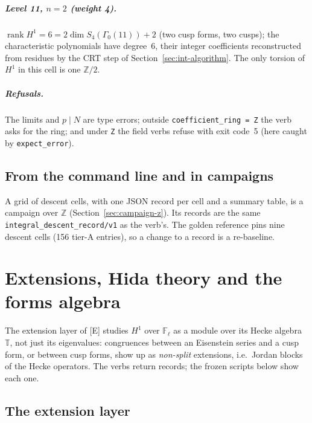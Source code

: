 \documentclass[11pt,openany]{report}
\newcommand{\Z}{\mathbb{Z}}
\newcommand{\Fl}{\mathbb{F}_{\ell}}
\newcommand{\vb}[1]{\texttt{#1}}
\begin{document}
\paragraph{Level 11, \texorpdfstring{$n=2$}{n=2} (weight 4).} $\operatorname{rank}H^1=6=2\dim S_4(\Gamma_0(11))+2$ (two
cusp forms, two cusps); the characteristic polynomials have degree~6, their integer coefficients reconstructed from residues by the CRT step of
Section~\ref{sec:int-algorithm}. The only torsion of $H^1$ in this cell is one $\Z/2$.

\paragraph{Refusals.} The limits and $p\mid N$ are type errors; outside \texttt{coefficient\_ring = Z} the verb asks for the
ring; and under \texttt{Z} the field verbs refuse with exit code~5 (here caught by \vb{expect\_error}).

\section{From the command line and in campaigns}\label{sec:int-campaigns}

A grid of descent cells, with one JSON record per cell and a summary table, is a campaign over $\Z$
(Section~\ref{sec:campaign-z}). Its records are the same \texttt{integral\_descent\_record/v1} as the verb's. The golden reference
pins nine descent cells (156 tier-A entries), so a change to a record is a re-baseline.

\chapter{Extensions, Hida theory and the forms algebra}\label{ch:ext}

The extension layer of [E] studies $H^1$ over $\Fl$ as a module over its Hecke algebra $\mathbb T$, not just its
eigenvalues: congruences between an Eisenstein series and a cusp form, or between cusp forms, show up as \emph{non-split}
extensions, i.e.\ Jordan blocks of the Hecke operators. The verbs return records; the frozen scripts below show each one.

\section{The extension layer}\label{sec:extlayer}
\end{document}
